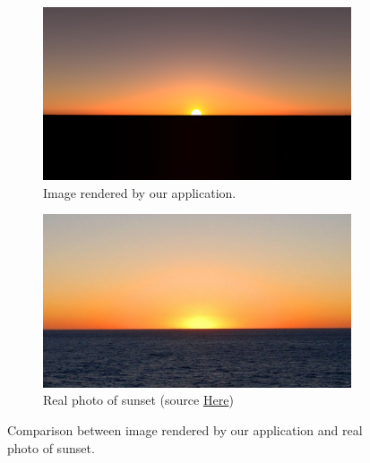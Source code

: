 \documentclass{ctuthesis}
\begin{document}
\begin{figure}[h]
     \centering
     \begin{subfigure}[b]{0.49\textwidth}
         \centering
         \includegraphics[width=\textwidth]{media/Sunset_atmo_yellow.png}
         \caption{Image rendered by our application.}
         \label{fig:Render of yellow sunset}
     \end{subfigure}
     \hfill
     \begin{subfigure}[b]{0.49\textwidth}
         \centering
         \includegraphics[width=\textwidth]{media/Sunset_atmo_yellow_real.png}
         \caption{Real photo of sunset (source \href{https://wallpaperaccess.com/clear-sunset}{Here})}
         \label{fig:Photo of yellow sunset}
     \end{subfigure}
     \hfill
        \caption{Comparison between image rendered by our application and real photo of sunset.}
        \label{fig:Atmosphere yellow sunset comparison}
\end{figure}
\end{document}
